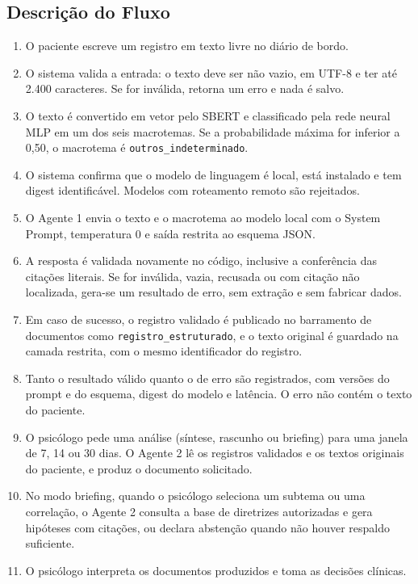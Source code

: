 \documentclass[12pt,a4paper]{article}
\begin{document}
\subsection{Descrição do Fluxo}
\begin{enumerate}
  \item O paciente escreve um registro em texto livre no diário de bordo.
  \item O sistema valida a entrada: o texto deve ser não vazio, em UTF-8 e ter até 2.400
        caracteres. Se for inválida, retorna um erro e nada é salvo.
  \item O texto é convertido em vetor pelo SBERT e classificado pela rede neural MLP
        em um dos seis macrotemas. Se a probabilidade máxima for inferior a 0,50, o macrotema
        é \texttt{outros\_indeterminado}.
  \item O sistema confirma que o modelo de linguagem é local, está instalado e tem digest
        identificável. Modelos com roteamento remoto são rejeitados.
  \item O Agente 1 envia o texto e o macrotema ao modelo local com o System Prompt, temperatura
        0 e saída restrita ao esquema JSON.
  \item A resposta é validada novamente no código, inclusive a conferência das citações
        literais. Se for inválida, vazia, recusada ou com citação não localizada, gera-se um
        resultado de erro, sem extração e sem fabricar dados.
  \item Em caso de sucesso, o registro validado é publicado no barramento de documentos como
        \texttt{registro\_estruturado}, e o texto original é guardado na camada restrita, com o
        mesmo identificador do registro.
  \item Tanto o resultado válido quanto o de erro são registrados, com versões do prompt e do
        esquema, digest do modelo e latência. O erro não contém o texto do paciente.
  \item O psicólogo pede uma análise (síntese, rascunho ou briefing) para uma janela de 7, 14 ou
        30 dias. O Agente 2 lê os registros validados e os textos originais do paciente, e produz
        o documento solicitado.
  \item No modo briefing, quando o psicólogo seleciona um subtema ou uma correlação, o Agente 2
        consulta a base de diretrizes autorizadas e gera hipóteses com citações, ou declara
        abstenção quando não houver respaldo suficiente.
  \item O psicólogo interpreta os documentos produzidos e toma as decisões clínicas.
\end{enumerate}
\end{document}
